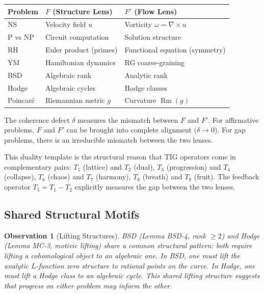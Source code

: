 \documentclass[11pt]{article}
\newtheorem{observation}[theorem]{Observation}
\DeclareMathOperator{\Rm}{Rm}
\begin{document}
\begin{center}
\begin{tabular}{@{}lll@{}}
\toprule
Problem & $F$ (Structure Lens) & $F'$ (Flow Lens) \\
\midrule
NS & Velocity field $u$ & Vorticity $\omega = \nabla \times u$ \\
P vs NP & Circuit computation & Solution structure \\
RH & Euler product (primes) & Functional equation (symmetry) \\
YM & Hamiltonian dynamics & RG coarse-graining \\
BSD & Algebraic rank & Analytic rank \\
Hodge & Algebraic cycles & Hodge classes \\
Poincar\'e & Riemannian metric $g$ & Curvature $\Rm(g)$ \\
\bottomrule
\end{tabular}
\end{center}

\noindent
The coherence defect $\delta$ measures the mismatch between $F$ and
$F'$.  For affirmative problems, $F$ and $F'$ can be brought into
complete alignment ($\delta \to 0$).  For gap problems, there is an
irreducible mismatch between the two lenses.

This duality template is the structural reason that TIG operators
come in complementary pairs: $T_1$ (lattice) and $T_2$ (dual),
$T_3$ (progression) and $T_4$ (collapse), $T_6$ (chaos) and $T_7$
(harmony), $T_8$ (breath) and $T_9$ (fruit).  The feedback operator
$T_5 = T_1 - T_2$ explicitly measures the gap between the two lenses.

\subsection{Shared Structural Motifs}
\label{subsec:shared}

\begin{observation}[Lifting Structures]
BSD (Lemma BSD-4, rank $\geq 2$) and Hodge (Lemma MC-3, motivic
lifting) share a common structural pattern: both require lifting a
cohomological object to an algebraic one.  In BSD, one must lift
the analytic $L$-function zero structure to rational points on the
curve.  In Hodge, one must lift a Hodge class to an algebraic cycle.
This shared lifting structure suggests that progress on either problem
may inform the other.
\end{observation}
\end{document}
